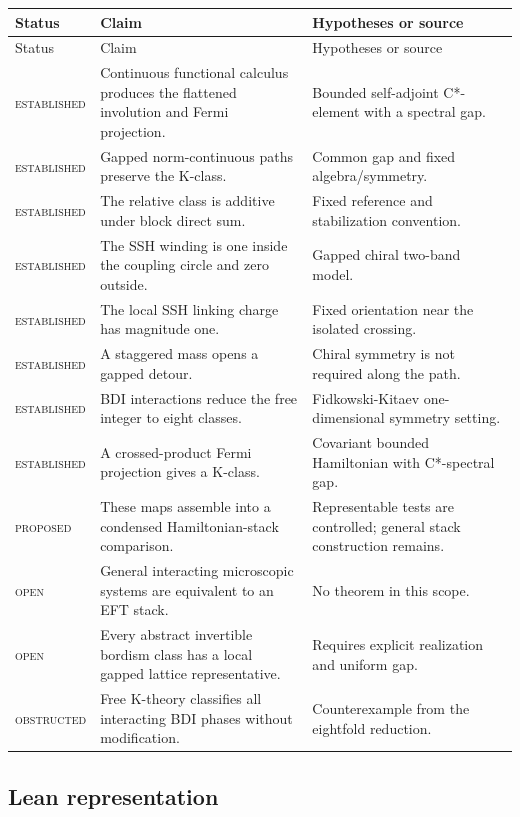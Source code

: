 \documentclass[12pt]{article}
\theoremstyle{definition}
\theoremstyle{remark}
\newcommand{\status}[1]{\textsc{#1}}
\begin{document}
\begin{longtable}{p{}p{}p{}}
\toprule
Status & Claim & Hypotheses or source \\
\midrule
\endfirsthead
\toprule
Status & Claim & Hypotheses or source \\
\midrule
\endhead
\status{established} & Continuous functional calculus produces the flattened involution and Fermi projection. & Bounded self-adjoint C*-element with a spectral gap.\\
\status{established} & Gapped norm-continuous paths preserve the K-class. & Common gap and fixed algebra/symmetry.\\
\status{established} & The relative class is additive under block direct sum. & Fixed reference and stabilization convention.\\
\status{established} & The SSH winding is one inside the coupling circle and zero outside. & Gapped chiral two-band model.\\
\status{established} & The local SSH linking charge has magnitude one. & Fixed orientation near the isolated crossing.\\
\status{established} & A staggered mass opens a gapped detour. & Chiral symmetry is not required along the path.\\
\status{established} & BDI interactions reduce the free integer to eight classes. & Fidkowski-Kitaev one-dimensional symmetry setting.\\
\status{established} & A crossed-product Fermi projection gives a K-class. & Covariant bounded Hamiltonian with C*-spectral gap.\\
\status{proposed} & These maps assemble into a condensed Hamiltonian-stack comparison. & Representable tests are controlled; general stack construction remains.\\
\status{open} & General interacting microscopic systems are equivalent to an EFT stack. & No theorem in this scope.\\
\status{open} & Every abstract invertible bordism class has a local gapped lattice representative. & Requires explicit realization and uniform gap.\\
\status{obstructed} & Free K-theory classifies all interacting BDI phases without modification. & Counterexample from the eightfold reduction.\\
\bottomrule
\end{longtable}

\subsection{Lean representation}
\end{document}

